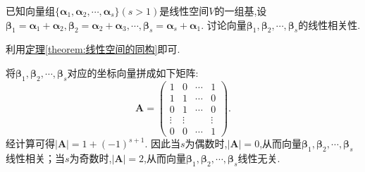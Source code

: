\documentclass[lang=cn,newtx,10pt,scheme=chinese]{elegantbook}
\begin{document}
\begin{example}
已知向量组\(\{\boldsymbol{\alpha}_1,\boldsymbol{\alpha}_2,\cdots,\boldsymbol{\alpha}_s\}(s > 1)\)是线性空间\(V\)的一组基,设\(\boldsymbol{\beta}_1=\boldsymbol{\alpha}_1+\boldsymbol{\alpha}_2,\boldsymbol{\beta}_2=\boldsymbol{\alpha}_2+\boldsymbol{\alpha}_3,\cdots,\boldsymbol{\beta}_s=\boldsymbol{\alpha}_s+\boldsymbol{\alpha}_1\). 讨论向量\(\boldsymbol{\beta}_1,\boldsymbol{\beta}_2,\cdots,\boldsymbol{\beta}_s\)的线性相关性.
\end{example}
\begin{note}
    利用\hyperref[theorem:线性空间的同构]{定理\ref{theorem:线性空间的同构}}即可.
\end{note}
\begin{solution}
将\(\boldsymbol{\beta}_1,\boldsymbol{\beta}_2,\cdots,\boldsymbol{\beta}_s\)对应的坐标向量拼成如下矩阵:
\[
\boldsymbol{A}=\begin{pmatrix}
1&0&\cdots&1\\
1&1&\cdots&0\\
0&1&\cdots&0\\
\vdots&\vdots&&\vdots\\
0&0&\cdots&1
\end{pmatrix}.
\]
经计算可得\(|\boldsymbol{A}| = 1+(-1)^{s + 1}\). 因此当\(s\)为偶数时,\(|\boldsymbol{A}| = 0\),从而向量\(\boldsymbol{\beta}_1,\boldsymbol{\beta}_2,\cdots,\boldsymbol{\beta}_s\)线性相关；当\(s\)为奇数时,\(|\boldsymbol{A}| = 2\),从而向量\(\boldsymbol{\beta}_1,\boldsymbol{\beta}_2,\cdots,\boldsymbol{\beta}_s\)线性无关. 
\end{solution}
\end{document}
